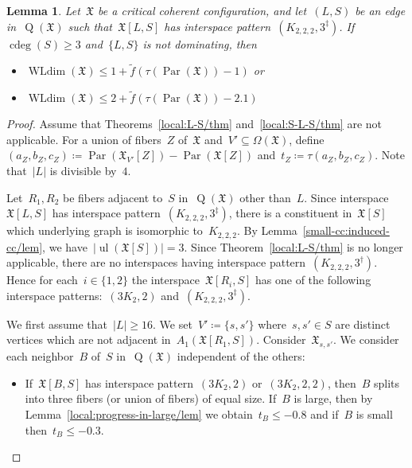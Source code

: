 \documentclass[english,a4paper]{article}
\theoremstyle{plain}
\newtheorem{lemma}      [theorem]{Lemma}
\theoremstyle{definition}
\newcommand{\abs}[1]{| #1 |}
\newcommand{\coherentConfig}{\ensuremath{\mathfrak{X}}}
\newcommand{\interspace}[2]{\ensuremath{\coherentConfig[#1,#2]}}
\newcommand{\inducedCC}[1]{\ensuremath{\coherentConfig[#1]}}
\DeclareMathOperator*{\ul}{ul}
\newcommand{\vertices}{\ensuremath{\Omega}}
\DeclareMathOperator*{\WLdim}{WLdim}
\newcommand{\wldim}[1]{\ensuremath{\WLdim\left(#1\right)}}
\DeclareMathOperator*{\Quotient}{Q}
\newcommand{\quotientGraph}[1]{\ensuremath{\Quotient(#1)}}
\DeclareMathOperator{\ColorDeg}{cdeg}
\newcommand{\colorDeg}[1]{\ensuremath{\ColorDeg\left(#1\right)}}
\newcommand{\f}{f}
\DeclareMathOperator{\parameters}{Par}
\newcommand{\ipsixMatching}             {\ensuremath{(\disjointCliques{3}{2},2)}}
\newcommand{\ipsixMatchingTwice}        {\ensuremath{(\disjointCliques{3}{2},2,2)}}
\newcommand{\ipsixMatchingComplement} {\ensuremath{(\clique{2,2,2},3^\dag)}}
\newcommand{\ipsixMatchingComplementD}{\ensuremath{(\clique{2,2,2},3^\ddag)}}
\newcommand{\clique}[1]{\ensuremath{K_{#1}}}
\newcommand{\disjointCliques}[2]{\ensuremath{#1 \clique{#2}}}
\begin{document}
\begin{lemma}
\label{local:K222-3D/lem}
    Let~$\coherentConfig$ be a critical coherent configuration, and let~$(L,S)$ be an edge in~$\quotientGraph{\coherentConfig}$ such that~$\interspace{L}{S}$ has interspace pattern~$\ipsixMatchingComplementD$.
    If~$\colorDeg{S} \geq 3$ and~$\{L,S\}$ is not dominating, then
    \begin{itemize}
        \item $\wldim{\coherentConfig} \leq 1 + \widetilde{\f}( \tau(\parameters(\coherentConfig)) - 1)$ or
        \item $\wldim{\coherentConfig} \leq 2 + \widetilde{\f}( \tau(\parameters(\coherentConfig)) - 2.1)$
    \end{itemize}
\end{lemma}
\begin{proof}
    Assume that Theorems~\ref{local:L-S/thm} and~\ref{local:S-L-S/thm} are not applicable.
    For a union of fibers~$Z$ of~$\coherentConfig$ and~$V' \subseteq \vertices(\coherentConfig)$, define~$(a_Z,b_Z,c_Z) \coloneqq \parameters(\coherentConfig_{V'}[Z]) - \parameters(\coherentConfig[Z])$ and~$t_Z \coloneqq \tau(a_Z,b_Z,c_Z)$.
    Note that~$|L|$ is divisible by~$4$.

    Let~$R_1,R_2$ be fibers adjacent to~$S$ in~$\quotientGraph{\coherentConfig}$ other than~$L$.
    Since interspace~$\interspace{L}{S}$ has interspace pattern~$\ipsixMatchingComplementD$, there is a constituent in~$\inducedCC{S}$ which underlying graph is isomorphic to~$\clique{2,2,2}$.
    By Lemma~\ref{small-cc:induced-cc/lem}, we have~$|\ul(\inducedCC{S})| = 3$.
    Since Theorem~\ref{local:L-S/thm} is no longer applicable, there are no interspaces having interspace pattern~$\ipsixMatchingComplement$.
    Hence for each~$i \in \{1,2\}$ the interspace~$\interspace{R_i}{S}$ has one of the following interspace patterns:~$\ipsixMatching$ and~$\ipsixMatchingComplementD$.

    We first assume that~$\abs{L}\geq 16$.
    We set~$V' \coloneqq \{s,s'\}$ where~$s,s' \in S$ are distinct vertices which are not adjacent in~$A_1(\interspace{R_1}{S})$.
    Consider~$\coherentConfig_{s,s'}$.
    We consider each neighbor~$B$ of~$S$ in~$\quotientGraph{\coherentConfig}$ independent of the others:
    \begin{itemize}
        \item
        If~$\interspace{B}{S}$ has interspace pattern~$\ipsixMatching$ or~$\ipsixMatchingTwice$, then~$B$ splits into three fibers (or union of fibers) of equal size.
        If~$B$ is large, then by Lemma~\ref{local:progress-in-large/lem} we obtain~$t_B \leq -0.8$ and if~$B$ is small then~$t_{B} \leq -0.3$.


\end{itemize}
\end{proof}
\end{document}
